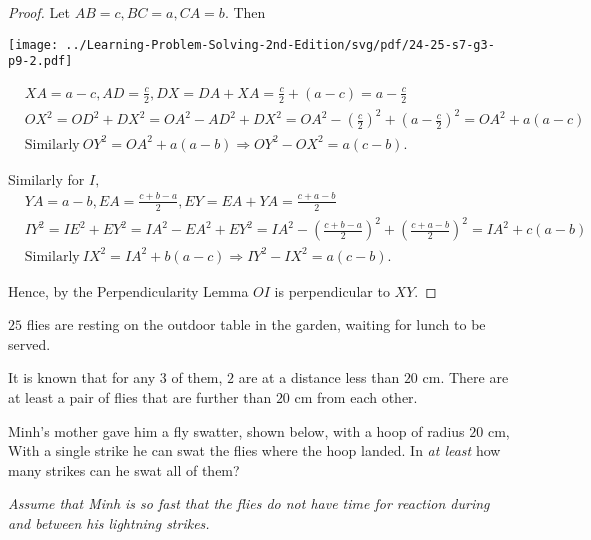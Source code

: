 \documentclass{article}
\begin{document}
\begin{proof}
    Let $AB=c, BC=a, CA=b.$ Then 

    \begin{center}
        \texttt{[image: ../Learning-Problem-Solving-2nd-Edition/svg/pdf/24-25-s7-g3-p9-2.pdf]}
    \end{center}
    
    \[ 
        \begin{aligned}
            &XA = a-c, AD=\frac{c}{2}, DX = DA + XA = \frac{c}{2} + (a-c) = a - \frac{c}{2}\\
            &OX^2 = OD^2 + DX^2 = OA^2 - AD^2 + DX^2 = OA^2 - \left(\frac{c}{2}\right)^2 + \left(a - \frac{c}{2}\right)^2 = OA^2 + a(a-c)\\
            &\text{Similarly}\ OY^2 = OA^2 + a(a-b) \Rightarrow OY^2 - OX^2 = a(c-b).
        \end{aligned}
    \]

    Similarly for $I,$
    \[ 
        \begin{aligned}
            &YA=a-b, EA = \frac{c+b-a}{2}, EY = EA + YA = \frac{c+a-b}{2}\\
            &IY^2 = IE^2 + EY^2 = IA^2 - EA^2 + EY^2 = IA^2 - \left(\frac{c+b-a}{2}\right)^2 + \left(\frac{c+a-b}{2}\right)^2 = IA^2 + c(a-b)\\
            &\text{Similarly}\ IX^2 = IA^2 + b(a-c) \Rightarrow IY^2 - IX^2 = a(c-b).
        \end{aligned}
    \]

    Hence, by the Perpendicularity Lemma $OI$ is perpendicular to $XY.$
\end{proof}

\newpage

\begin{problem}
    $25$ flies are resting on the outdoor table in the garden, waiting for lunch to be served.
    \begin{itemize}[topsep=0pt, partopsep=0pt, itemsep=0pt]
        \ii It is known that for any $3$ of them, $2$ are at a distance less than $20$ cm.
        \ii There are at least a pair of flies that are further than $20$ cm from each other.
    \end{itemize}
    
    Minh's mother gave him a fly swatter, shown below, with a hoop of radius $20$ cm,
    With a single strike he can swat the flies where the hoop landed.
    In \textit{at least} how many strikes can he swat all of them?

    \textit{Assume that Minh is so fast that the flies do not have time for reaction during and between his lightning strikes.}
\end{problem}
\end{document}
